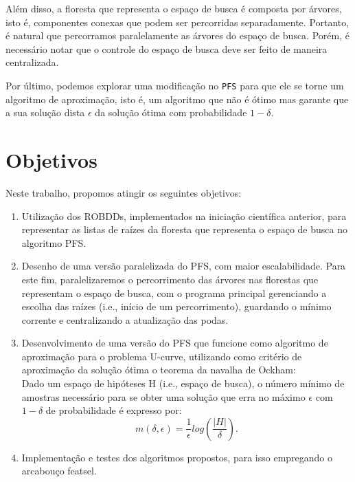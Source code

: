 \documentclass[12pt]{article}
\begin{document}
Além disso, a floresta que representa o espaço de busca é composta por
árvores, isto é, componentes conexas que podem ser percorridas 
separadamente. Portanto, é natural que percorramos paralelamente as 
árvores do espaço de busca. Porém, é necessário notar que o controle do
espaço de busca deve ser feito de maneira centralizada.

Por último, podemos explorar uma modificação no {\tt PFS} para que ele
se torne um algoritmo de aproximação, isto é, um algoritmo que não é 
ótimo mas garante que a sua solução dista $\epsilon$ da solução ótima
com probabilidade $1 - \delta$.

\section{Objetivos}
Neste trabalho, propomos atingir os seguintes objetivos:

\begin{enumerate}
\item Utilização dos ROBDDs, implementados na iniciação científica
anterior, para representar as listas de raízes da floresta que 
representa o espaço de busca no algoritmo PFS.

\item Desenho de uma versão paralelizada do PFS, com maior
escalabilidade. Para este fim, paralelizaremos o percorrimento das
árvores nas florestas que representam o espaço de busca, com o programa
principal gerenciando a escolha das raízes (i.e., início de um 
percorrimento), guardando o mínimo corrente e centralizando a
atualização das podas.

\item Desenvolvimento de uma versão do PFS que funcione como algoritmo 
de aproximação para o problema U-curve, utilizando como critério de
aproximação da solução ótima o teorema da navalha de Ockham:\\
\smallskip
Dado um espaço de hipóteses H (i.e., espaço de busca), o número mínimo 
de amostras necessário para se obter uma solução que erra no máximo 
$\epsilon$ com $1 - \delta$ de probabilidade é expresso por:
\begin{equation}
\displaystyle  m(\delta,\epsilon) = 
    \frac{1}{\epsilon} log (\frac{|H|}{\delta}).
\end{equation}

\item Implementação e testes dos algoritmos propostos, para isso
empregando o arcabouço featsel.
\end{enumerate}
\end{document}
